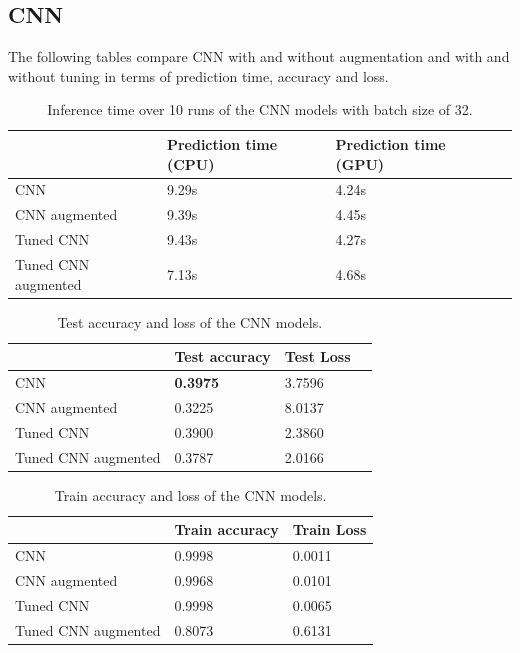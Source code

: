 \pagebreak

\subsection{CNN}
The following tables compare CNN with and without augmentation and with and without tuning in terms of prediction time, accuracy and loss.

\begin{table}[ht]
  \begin{tabular}{|l|l|l|l|}
    \hline
                        & Prediction time (CPU) & Prediction time (GPU) \\ \hline
    CNN                 & 9.29s                 & 4.24s                 \\ \hline
    CNN augmented       & 9.39s                 & 4.45s                 \\ \hline
    Tuned CNN           & 9.43s                 & 4.27s                 \\ \hline
    Tuned CNN augmented & 7.13s                 & 4.68s                 \\ \hline
  \end{tabular}
  \caption{Inference time over 10 runs of the CNN models with batch size of 32.}
  \label{table:pred_time}
\end{table}

\begin{table}[ht]
  \centering
  \begin{tabular}{|l|l|l|l|}
    \hline
                        & Test accuracy   & Test Loss \\ \hline
    CNN                 & \textbf{0.3975} & 3.7596    \\ \hline
    CNN augmented       & 0.3225          & 8.0137    \\ \hline
    Tuned CNN           & 0.3900          & 2.3860    \\ \hline
    Tuned CNN augmented & 0.3787          & 2.0166    \\ \hline
  \end{tabular}
  \caption{Test accuracy and loss of the CNN models.}
  \label{table:test_CNN}
\end{table}

\begin{table}[ht]
  \centering
  \begin{tabular}{|l|l|l|}
    \hline
                        & Train accuracy & Train Loss \\ \hline
    CNN                 & 0.9998         & 0.0011     \\ \hline
    CNN augmented       & 0.9968         & 0.0101     \\ \hline
    Tuned CNN           & 0.9998         & 0.0065     \\ \hline
    Tuned CNN augmented & 0.8073         & 0.6131     \\ \hline
  \end{tabular}
  \caption{Train accuracy and loss of the CNN models.}
  \label{table:train_CNN}
\end{table}

